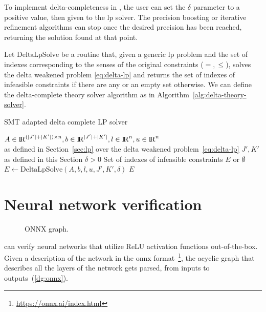 \documentclass[runningheads]{llncs}
\begin{document}
To implement delta-completeness in \dlinear, the user can set the $\delta$ parameter to a positive value, then given to the \gls{lp} solver.
The precision boosting or iterative refinement algorithms can stop once the desired precision has been reached, returning the solution found at that point.

Let $\text{DeltaLpSolve}$ be a routine that, given a generic \gls{lp} problem and the set of indexes corresponding to the senses of the original constraints ($=, \le$), solves the delta weakened problem \eqref{eq:delta-lp} and returns the set of indexes of infeasible constraints if there are any or an empty set otherwise.
We can define the delta-complete theory solver algorithm as in Algorithm~\ref{alg:delta-theory-solver}.

\begin{algorithm}
    \caption{SMT adapted delta complete LP solver}\label{alg:delta-theory-solver}
    \begin{algorithmic}
        \Require $A \in {\rm I\!R}^{(|J'| + |K'|) \times n}, b \in {\rm I\!R}^{|J'| + |K'|}, l \in {\rm I\!R}^n, u \in {\rm I\!R}^n$ \\
        \qquad as defined in Section~\ref{sec:lp} over the delta weakened problem~\eqref{eq:delta-lp}
        \Require $J', K'$ as defined in this Section
        \Require $\delta > 0$
        \Ensure Set of indexes of infeasible constraints $E$ or $\emptyset$
        \State $E \gets \text{DeltaLpSolve}(A, b, l, u, J', K', \delta)$ 
        \State \Return $E$
    \end{algorithmic}
\end{algorithm}


\section{Neural network verification}
\label{sec:nn-verification}

\begin{figure}
    \captionsetup{font=small}
    \resizebox{1.04\linewidth}{!}{%
        
    }
    \caption{ONNX graph.}
    \label{dg:onnx}
\end{figure}

\dlinear can verify neural networks that utilize ReLU activation functions out-of-the-box.
Given a description of the network in the \gls{onnx} format~\footnote{\url{https://onnx.ai/index.html}}, the acyclic graph that describes all the layers of the network gets parsed, from inputs to outputs~(\autoref{dg:onnx}).
\end{document}
